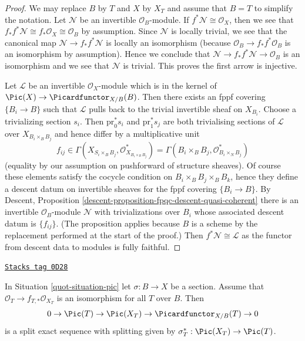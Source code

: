 \begin{proof}
We may replace $B$ by $T$ and $X$ by $X_T$ and assume that $B = T$
to simplify the notation. Let $\mathcal{N}$ be an invertible
$\mathcal{O}_B$-module. If $f^*\mathcal{N} \cong \mathcal{O}_X$, then
we see that $f_*f^*\mathcal{N} \cong f_*\mathcal{O}_X \cong \mathcal{O}_B$
by assumption. Since $\mathcal{N}$ is locally trivial, we see that
the canonical map $\mathcal{N} \to f_*f^*\mathcal{N}$ is locally
an isomorphism (because $\mathcal{O}_B \to f_*f^*\mathcal{O}_B$
is an isomorphism by assumption). Hence we conclude that
$\mathcal{N} \to f_*f^*\mathcal{N} \to \mathcal{O}_B$ is an isomorphism
and we see that $\mathcal{N}$ is trivial. This proves the first arrow
is injective.

\medskip\noindent
Let $\mathcal{L}$ be an invertible $\mathcal{O}_X$-module which is in
the kernel of $\Pic(X) \to \Picardfunctor_{X/B}(B)$. Then there exists
an fppf covering $\{B_i \to B\}$ such that $\mathcal{L}$ pulls back
to the trivial invertible sheaf on $X_{B_i}$. Choose a trivializing
section $s_i$. Then $\text{pr}_0^*s_i$ and $\text{pr}_1^*s_j$ are both
trivialising sections of $\mathcal{L}$ over $X_{B_i \times_B B_j}$
and hence differ by a multiplicative unit
$$
f_{ij} \in
\Gamma(X_{S_i \times_B B_j}, \mathcal{O}_{X_{B_i \times_B B_j}}^*) =
\Gamma(B_i \times_B B_j, \mathcal{O}_{B_i \times_N B_j}^*)
$$
(equality by our assumption on pushforward of structure sheaves).
Of course these elements satisfy the cocycle condition on
$B_i \times_B B_j \times_B B_k$, hence they define a descent datum
on invertible sheaves for the fppf covering $\{B_i \to B\}$.
By Descent, Proposition \ref{descent-proposition-fpqc-descent-quasi-coherent}
there is an invertible $\mathcal{O}_B$-module $\mathcal{N}$
with trivializations over $B_i$ whose associated descent datum is
$\{f_{ij}\}$. (The proposition applies because $B$ is a scheme
by the replacement performed at the start of the proof.)
Then $f^*\mathcal{N} \cong \mathcal{L}$ as the
functor from descent data to modules is fully faithful.
\end{proof}

\begin{lemma}
\label{quot-lemma-flat-geometrically-connected-fibres-with-section}
\href{https://stacks.math.columbia.edu/tag/0D28}{\texttt{Stacks tag 0D28}}

In Situation \ref{quot-situation-pic} let $\sigma : B \to X$ be a section.
Assume that $\mathcal{O}_T \to f_{T, *}\mathcal{O}_{X_T}$ is an isomorphism
for all $T$ over $B$. Then
$$
0 \to \Pic(T) \to \Pic(X_T) \to \Picardfunctor_{X/B}(T) \to 0
$$
is a split exact sequence with splitting given by
$\sigma_T^* : \Pic(X_T) \to \Pic(T)$.
\end{lemma}

